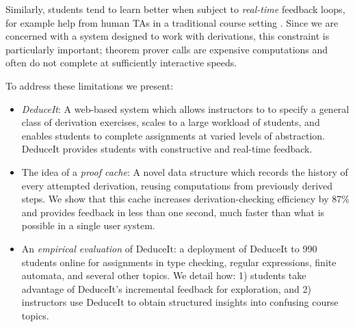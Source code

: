 \documentclass{sigchi}
\begin{document}
Similarly, students tend to learn better when subject to \textit{real-time} feedback loops, for example help from human TAs in a traditional course setting \cite{personalized-feedback, derivation-scoring, human-tutoring}. Since we are concerned with a system designed to work with derivations, this constraint is particularly important; theorem prover calls are expensive computations \cite{bisearch} and often do not complete at sufficiently interactive speeds.



To address these limitations we present:
\begin{itemize}
\item \textit{DeduceIt}: A web-based system which allows instructors to to specify a general class of derivation exercises, 
scales to a large workload of students, and enables students to complete assignments at varied levels of abstraction. DeduceIt provides students with constructive and real-time feedback.
\item The idea of a \textit{proof cache}: A novel data structure which records the history of every attempted derivation, reusing computations from previously derived steps. We show that this cache increases derivation-checking efficiency by 87\% and provides feedback in less than one second, much faster than what is possible in a single user system.
\item An \textit{empirical evaluation} of DeduceIt: a deployment of DeduceIt to 990 students online
for assignments in type checking, regular expressions, finite automata, and several other topics. We detail how: 1) students take advantage of DeduceIt's incremental feedback for exploration, and 2) instructors use DeduceIt to obtain structured insights into confusing course topics.
\end{itemize}
\end{document}
